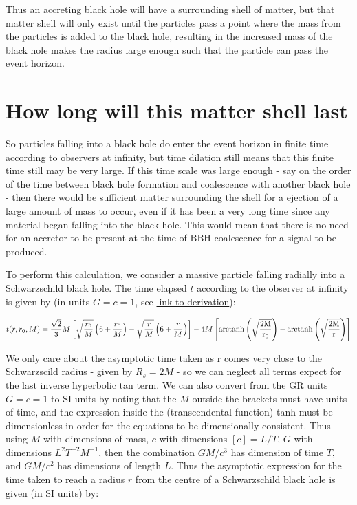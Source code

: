 \documentclass{article}
\begin{document}
Thus an accreting black hole will have a surrounding shell of matter, but that matter shell will only exist until the particles pass a point where the mass from the particles is added to the black hole, resulting in the increased mass of the black hole makes the radius large enough such that the particle can pass the event horizon.

\section{How long will this matter shell last}

So particles falling into a black hole do enter the event horizon in finite time according to observers at infinity, but time dilation still means that this finite time still may be very large. If this time scale was large enough - say on the order of the time between black hole formation and coalescence with another black hole - then there would be sufficient matter surrounding the shell for a ejection of a large amount of mass to occur, even if it has been a very long time since any material began falling into the black hole. This would mean that there is no need for an accretor to be present at the time of BBH coalescence for a signal to be produced.

To perform this calculation, we consider a massive particle falling radially into a Schwarzschild black hole. The time elapsed $t$ according to the observer at infinity is given by (in units $G=c=1$, see \href{https://physics.stackexchange.com/questions/449151/closed-form-expression-for-position-as-function-of-time-of-object-falling-direct}{link to derivation}):

\begin{equation}
    t(r,r_0, M)=
    \frac{\sqrt{2}}{3} M \left[ \sqrt{\frac{r_0}{M}} \left( 6 + \frac{r_0}{M} \right) - \sqrt{\frac{r}{M}} \left( 6 + \frac{r}{M} \right) 
    \right]
    - 4 M \left[ 
    \rm{arctanh}\left( \sqrt{\frac{2 M}{r_0}} \right) - 
    \rm{arctanh}\left( \sqrt{\frac{2 M}{r}} \right)
    \right]
\end{equation}

We only care about the asymptotic time taken as r comes very close to the Schwarzscild radius - given by $R_s=2 M$ - so we can neglect all terms expect for the last inverse hyperbolic tan term. We can also convert from the GR units $G=c=1$ to SI units by noting that the $M$ outside the brackets must have units of time, and the expression inside the (transcendental function) tanh must be dimensionless in order for the equations to be dimensionally consistent. Thus using $M$ with dimensions of mass, $c$ with dimensions $[c]=L/T$, $G$ with dimensions $L^2 T^{-2} M^{-1}$, then the combination $G M / c^3$ has dimension of time $T$, and $G M / c^2$ has dimensions of length $L$. Thus the asymptotic expression for the time taken to reach a radius $r$ from the centre of a Schwarzschild black hole is given (in SI units) by:
\end{document}
